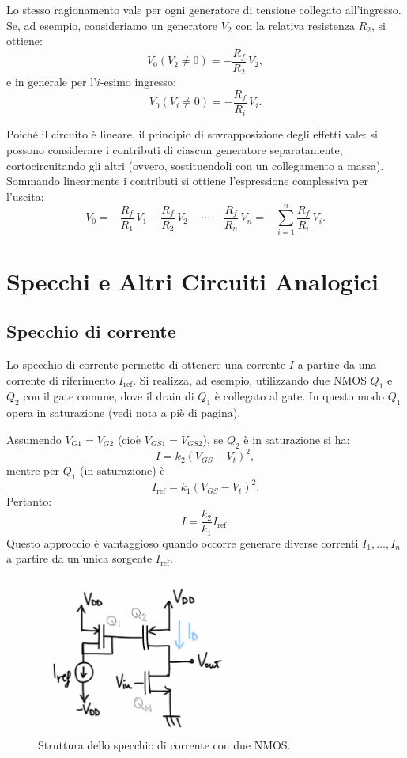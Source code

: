 Lo stesso ragionamento vale per ogni generatore di tensione collegato all’ingresso. Se, ad esempio, consideriamo un generatore \( V_2 \) con la relativa resistenza \( R_2 \), si ottiene:
\[
V_0(V_2 \neq 0) = -\frac{R_f}{R_2}\, V_2,
\]
e in generale per l'\( i \)-esimo ingresso:
\[
V_0(V_i \neq 0) = -\frac{R_f}{R_i}\, V_i.
\]

Poiché il circuito è lineare, il principio di sovrapposizione degli effetti vale: si possono considerare i contributi di ciascun generatore separatamente, cortocircuitando gli altri (ovvero, sostituendoli con un collegamento a massa). Sommando linearmente i contributi si ottiene l’espressione complessiva per l’uscita:
\[
V_0 = -\frac{R_f}{R_1}\, V_1 - \frac{R_f}{R_2}\, V_2 - \cdots - \frac{R_f}{R_n}\, V_n = -\sum_{i=1}^{n} \frac{R_f}{R_i}\, V_i.
\]
\newpage
\section{Specchi e Altri Circuiti Analogici}

\subsection{Specchio di corrente}

Lo specchio di corrente permette di ottenere una corrente \(I\) a partire da una corrente di riferimento \(I_{\text{ref}}\). Si realizza, ad esempio, utilizzando due NMOS \(Q_1\) e \(Q_2\) con il gate comune, dove il drain di \(Q_1\) è collegato al gate. In questo modo \(Q_1\) opera in saturazione (vedi nota a piè di pagina).

Assumendo \(V_{G1} = V_{G2}\) (cioè \(V_{GS1} = V_{GS2}\)), se \(Q_2\) è in saturazione si ha:
\[
I = k_2 (V_{GS} - V_t)^2,
\]
mentre per \(Q_1\) (in saturazione) è
\[
I_{\text{ref}} = k_1 (V_{GS} - V_t)^2.
\]
Pertanto:
\[
I = \frac{k_2}{k_1} I_{\text{ref}}.
\]
Questo approccio è vantaggioso quando occorre generare diverse correnti \(I_1,\dots,I_n\) a partire da un'unica sorgente \(I_{\text{ref}}\).\\[2mm]
\begin{figure}[H]
    \centering
    \includegraphics[width=0.6\textwidth]{images/1.4.1.1.png}
    \caption{Struttura dello specchio di corrente con due NMOS.}
    \label{fig:specchio_corrente}
\end{figure}

